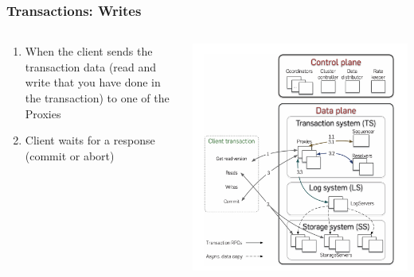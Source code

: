 \begin{frame}
    \frametitle{Transactions: Writes}
    \begin{columns}
        \begin{column}{0.5\textwidth}
            \begin{enumerate}
                \item When the client sends the transaction data (read and write that you have done in the transaction) to one of the Proxies
                \item Client waits for a response (commit or abort)
            \end{enumerate}
        \end{column}
        \begin{column}{0.5\textwidth}
            \centering
            \includegraphics[width=\textwidth]{img/2-Architecture/Architecture and transaction processing.png}
        \end{column}
    \end{columns}
\end{frame}


